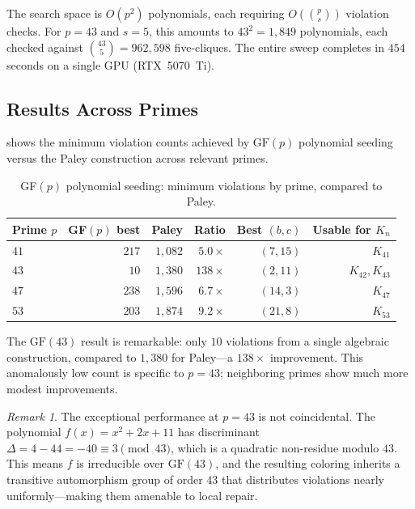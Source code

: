 \documentclass[12pt,a4paper]{article}
\theoremstyle{definition}
\theoremstyle{remark}
\newtheorem{remark}[theorem]{Remark}
\newcommand{\GF}[1]{\mathrm{GF}(#1)}
\newcommand{\Kn}[1]{K_{#1}}
\begin{document}
The search space is $O(p^2)$ polynomials, each requiring $O\!\left(\binom{p}{s}\right)$ violation checks.  For $p = 43$ and $s = 5$, this amounts to $43^2 = 1{,}849$ polynomials, each checked against $\binom{43}{5} = 962{,}598$ five-cliques.  The entire sweep completes in $454$ seconds on a single GPU (RTX~5070~Ti).

\subsection{Results Across Primes}

 shows the minimum violation counts achieved by $\GF{p}$ polynomial seeding versus the Paley construction across relevant primes.

\begin{table}[H]
\centering
\caption{GF$(p)$ polynomial seeding: minimum violations by prime, compared to Paley.}\label{tab:gfp-comparison}
\begin{tabular}{@{}lrrrrr@{}}
\toprule
\textbf{Prime $p$} & \textbf{GF$(p)$ best} & \textbf{Paley} & \textbf{Ratio} & \textbf{Best $(b,c)$} & \textbf{Usable for $\Kn{n}$} \\
\midrule
$41$ & $217$ & $1{,}082$ & $5.0\times$ & $(7, 15)$ & $\Kn{41}$ \\
$43$ & $10$ & $1{,}380$ & $138\times$ & $(2, 11)$ & $\Kn{42}, \Kn{43}$ \\
$47$ & $238$ & $1{,}596$ & $6.7\times$ & $(14, 3)$ & $\Kn{47}$ \\
$53$ & $203$ & $1{,}874$ & $9.2\times$ & $(21, 8)$ & $\Kn{53}$ \\
\bottomrule
\end{tabular}
\end{table}

The $\GF{43}$ result is remarkable: only $10$ violations from a single algebraic construction, compared to $1{,}380$ for Paley---a $138\times$ improvement.  This anomalously low count is specific to $p = 43$; neighboring primes show much more modest improvements.

\begin{remark}\label{rem:43special}
The exceptional performance at $p = 43$ is not coincidental.  The polynomial $f(x) = x^2 + 2x + 11$ has discriminant $\Delta = 4 - 44 = -40 \equiv 3 \pmod{43}$, which is a quadratic non-residue modulo $43$.  This means $f$ is irreducible over $\GF{43}$, and the resulting coloring inherits a transitive automorphism group of order $43$ that distributes violations nearly uniformly---making them amenable to local repair.
\end{remark}
\end{document}
